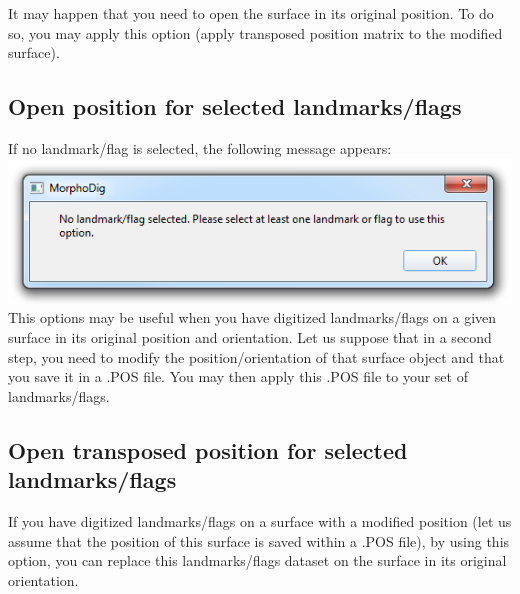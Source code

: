 It may happen that you need to open the surface in its original position. To do so, you may apply this option (apply transposed position matrix to the modified surface).

\subsection{Open position for selected landmarks/flags}
If no landmark/flag is selected, the following message
appears:\\
\includegraphics[scale=0.5]{images/07/position/no_landmark_selected.png}
\\
This options may be useful when you have digitized landmarks/flags on a given surface in its original position and orientation. Let us suppose that in a second step, you need to modify the position/orientation of that surface object and that you save it in a .POS file. You may then apply this .POS file to your set of landmarks/flags.

\subsection{Open transposed position for selected landmarks/flags}
If you have digitized landmarks/flags on a surface with a modified position (let us assume that the position of this surface is saved within a .POS file), by using this option, you can replace this landmarks/flags dataset on the surface in its original orientation. 


